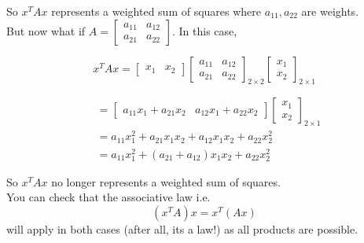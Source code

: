 \begin{enumerate}
So $x^T A x$ represents a weighted sum of squares where $a_{11}, a_{22}$ are weights.\\

But now what if $A=\left[\begin{array}{ll}a_{11} & a_{12} \\ a_{21} & a_{22}\end{array}\right]$. In this case,

\[
x^T A x=\left[\begin{array}{ll}
x_{1} & x_{2}
\end{array}\right]\left[\begin{array}{ll}
a_{11} & a_{12} \\
a_{21} & a_{22}
\end{array}\right]_{2 \times 2}\left[\begin{array}{l}
x_{1} \\
x_{2}
\end{array}\right]_{2 \times 1}
\]

\[
\begin{aligned}
& =\left[\begin{array}{rr}
a_{11} x_{1}+a_{21} x_{2} & a_{12} x_{1}+a_{22} x_{2}
\end{array}\right]\left[\begin{array}{l}
x_{1} \\
x_{2}
\end{array}\right]_{2 \times 1} \\
& =a_{11} x_{1}^{2}+a_{21} x_{1} x_{2}+a_{12} x_{1} x_{2}+a_{22} x_{2}^{2} \\
& =a_{11} x_{1}^{2}+\left(a_{21}+a_{12}\right) x_{1} x_{2}+a_{22} x_{2}^{2}
\end{aligned}
\]

So $x^T A x$ no longer represents a weighted sum of squares. \\

You can check that the associative law i.e.
\[
\left(x^T A\right) x=x^T(A x)
\]
will apply in both cases (after all, its a law!) as all products are possible.
\end{enumerate}


